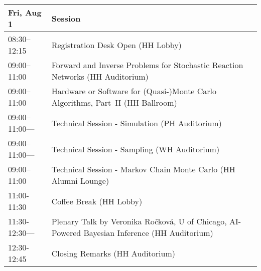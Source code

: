 \begin{table}
{\footnotesize
\begin{tabularx}{\textwidth}{>{\hsize=0.32\hsize}X|>{\hsize=1.7\hsize}X}
\hline
\textbf{Fri, Aug 1} & \textbf{Session} \\
\hline
\cellcolor{\EmptyColor}08:30–12:15 & \cellcolor{\EmptyColor}Registration Desk Open (HH Lobby) \\
\cellcolor{\SessionTitleColor}09:00–11:00 & \cellcolor{\SessionTitleColor}Forward and Inverse Problems for Stochastic Reaction Networks (HH Auditorium) \\
\cellcolor{\SessionTitleColor}09:00–11:00 & \cellcolor{\SessionTitleColor}Hardware or Software for (Quasi-)Monte Carlo Algorithms, Part~II (HH Ballroom) \\
\cellcolor{\SessionLightColor}09:00–11:00— & \cellcolor{\SessionLightColor}Technical Session - Simulation (PH Auditorium) \\
\cellcolor{\SessionLightColor}09:00–11:00— & \cellcolor{\SessionLightColor}Technical Session - Sampling (WH Auditorium) \\
\cellcolor{\SessionLightColor}09:00–11:00 & \cellcolor{\SessionLightColor}Technical Session - Markov Chain Monte Carlo (HH Alumni Lounge) \\
\cellcolor{\EmptyColor}11:00-11:30 & \cellcolor{\EmptyColor}Coffee Break (HH Lobby) \\
\cellcolor{\PlenaryColor}11:30-12:30— & \cellcolor{\PlenaryColor}Plenary Talk by Veronika Ročková, U of Chicago, AI-Powered Bayesian Inference (HH Auditorium) \\
\cellcolor{\PlenaryColor}12:30-12:45 & \cellcolor{\PlenaryColor}Closing Remarks (HH Auditorium) \\
\hline
\end{tabularx}
}
\end{table}


